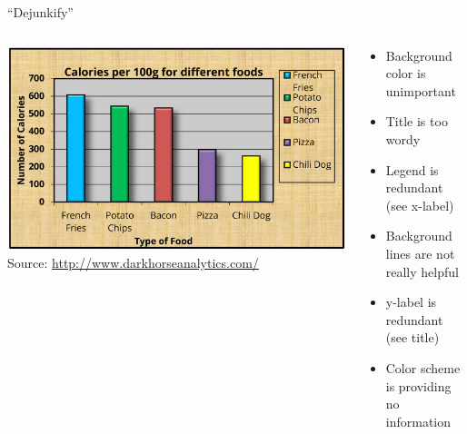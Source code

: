\documentclass[aspectratio=169]{../latex_main/tntbeamer}  %
\begin{document}
	\begin{frame}{``Dejunkify''}

        \begin{columns}
            \begin{column}{0.5\textwidth}
            
                \includegraphics[width=1\textwidth]{./figure/bad_figure.png}        
                {
                \footnotesize
                Source: \url{http://www.darkhorseanalytics.com/}
                }
            \end{column}
        
            \begin{column}{0.5\textwidth}
            
            \begin{itemize}
                \item Background color is unimportant
                \item Title is too wordy
                \item Legend is redundant (see x-label)
                \item Background lines are not really helpful
                \item y-label is redundant (see title)
                \item Color scheme is providing no information
            \end{itemize}
            
            \end{column}
            
        \end{columns}
	    
	\end{frame}
	
\end{document}
